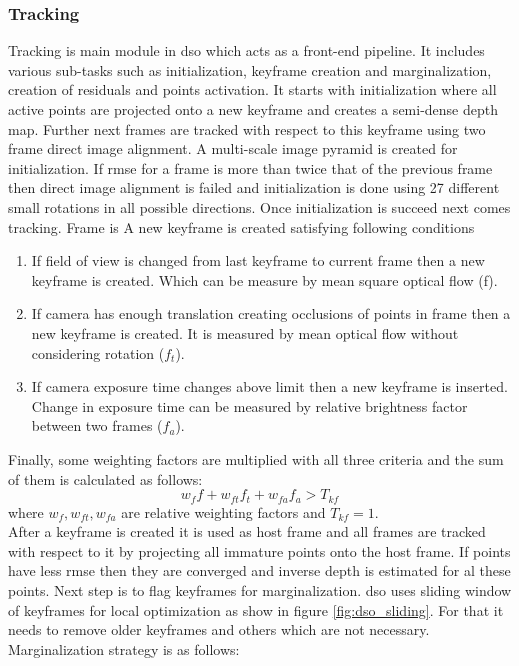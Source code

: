 \subsubsection{Tracking}
Tracking is main module in \acrshort{dso} which acts as a front-end pipeline. It includes various sub-tasks such as initialization, keyframe creation and marginalization, creation of residuals and points activation. It starts with initialization where all active points are projected onto a new keyframe and creates a semi-dense depth map. Further next frames are tracked with respect to this keyframe using two frame direct image alignment. A multi-scale image pyramid is created for initialization. If \acrshort{rmse} for a frame is more than twice that of the previous frame then direct image alignment is failed and initialization is done using 27 different small rotations in all possible directions. Once initialization is succeed next comes tracking. Frame is A new keyframe is created satisfying following conditions    
\begin{enumerate}
	\item If field of view is changed from last keyframe to current frame then a new keyframe is created. Which can be measure by mean square optical flow (f).
	\item If camera has enough translation creating occlusions of points in frame then a new keyframe is created. It is measured by mean optical flow without considering rotation ($f_{t}$).
	\item If camera exposure time changes above limit then a new keyframe is inserted. Change in exposure time can be measured by relative brightness factor between two frames ($f_{a}$).
\end{enumerate}
Finally, some weighting factors are multiplied with all three criteria and the sum of them is calculated as follows: 
\begin{equation*}
  w_{f} f + w_{ft} f_{t} + w_{fa} f_{a} > T_{kf}
\end{equation*} 
where $w_{f}, w_{ft}, w_{fa} $ are relative weighting factors and $ T_{kf} = 1. $ \\
\newline
After a keyframe is created it is used as host frame and all frames are tracked with respect to it by projecting all immature points onto the host frame. If points have less \acrshort{rmse} then they are converged and inverse depth is estimated for al these points. Next step is to flag keyframes for marginalization. \acrshort{dso} uses sliding window of keyframes for local optimization as show in figure \ref{fig:dso_sliding}. For that it needs to remove older keyframes and others which are not necessary. Marginalization strategy is as follows: 
